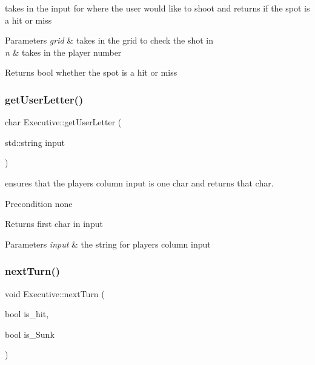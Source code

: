 takes in the input for where the user would like to shoot and returns if the spot is a hit or miss 


\begin{DoxyParams}{Parameters}
{\em grid} & takes in the grid to check the shot in \\
\hline
{\em n} & takes in the player number \\
\hline
\end{DoxyParams}
\begin{DoxyReturn}{Returns}
bool whether the spot is a hit or miss 
\end{DoxyReturn}
\mbox{\label{classExecutive_afeb631927beaf50e17e5a0ee0b85895f}} 
\subsubsection{\texorpdfstring{get\+User\+Letter()}{getUserLetter()}}
{\footnotesize\ttfamily char Executive\+::get\+User\+Letter (\begin{DoxyParamCaption}\item[{std\+::string}]{input }\end{DoxyParamCaption})}



ensures that the player\textquotesingle{}s column input is one char and returns that char. 

\begin{DoxyPrecond}{Precondition}
none 
\end{DoxyPrecond}
\begin{DoxyReturn}{Returns}
first char in input 
\end{DoxyReturn}

\begin{DoxyParams}{Parameters}
{\em input} & the string for player\textquotesingle{}s column input \\
\hline
\end{DoxyParams}
\mbox{\label{classExecutive_a7bdfcc2bf91bbd24f1b7d3642e3c8cfe}} 
\subsubsection{\texorpdfstring{next\+Turn()}{nextTurn()}}
{\footnotesize\ttfamily void Executive\+::next\+Turn (\begin{DoxyParamCaption}\item[{bool}]{is\+\_\+hit,  }\item[{bool}]{is\+\_\+\+Sunk }\end{DoxyParamCaption})}




